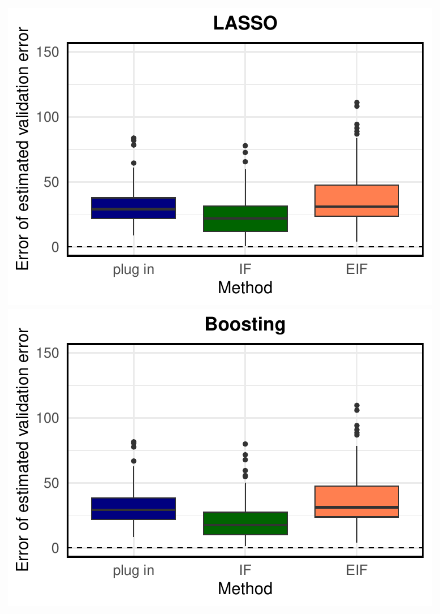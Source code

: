 \begin{figure}[ht]
        \centering
        \begin{minipage}{0.3\textwidth}
                \centering
                \includegraphics[clip, trim = 0cm 0cm 0cm 0cm, width = \textwidth]{plot/ACIC_linear_propensity_linear_HTE_estimator_error_LASSO.pdf}
        \end{minipage}
        \begin{minipage}{0.3\textwidth}
                \centering
                \includegraphics[clip, trim = 0cm 0cm 0cm 0cm, width = \textwidth]{plot/ACIC_linear_propensity_linear_HTE_estimator_error_Boosting.pdf}
        \end{minipage}
        \begin{minipage}{0.3\textwidth}
                \centering

\end{minipage}
\end{figure}
